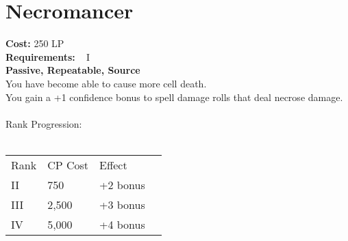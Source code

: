 \section{Necromancer}\label{perk:necromancer}
\textbf{Cost:} 250 LP\\
\textbf{Requirements:} ~ I\\
\textbf{Passive, Repeatable, Source}\\
You have become able to cause more cell death.\\
You gain a +1 confidence bonus to spell damage rolls that deal necrose damage.\\
\\
Rank Progression:\\
\\
\begin{tabular}{l | l | l | l}
    Rank & CP Cost &  Effect\\
    II & 750 & +2 bonus\\
    III & 2,500 & +3 bonus\\
    IV & 5,000 & +4 bonus\\
\end{tabular}